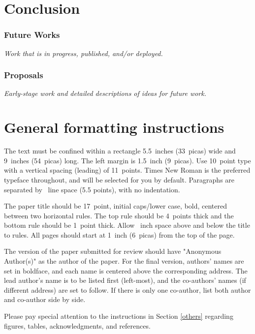 \documentclass{article}
\begin{document}
\section{Conclusion}

\subsubsection{Future Works}



\textit{Work that is in progress, published, and/or deployed.}

\subsubsection{Proposals}

\textit{Early-stage work and detailed descriptions of ideas for future work.}

\section{General formatting instructions}
\label{gen_inst}

The text must be confined within a rectangle 5.5~inches (33~picas) wide and
9~inches (54~picas) long. The left margin is 1.5~inch (9~picas).  Use 10~point
type with a vertical spacing (leading) of 11~points.  Times New Roman is the
preferred typeface throughout, and will be selected for you by default.
Paragraphs are separated by ~line space (5.5 points), with no
indentation.

The paper title should be 17~point, initial caps/lower case, bold, centered
between two horizontal rules. The top rule should be 4~points thick and the
bottom rule should be 1~point thick. Allow ~inch space above and
below the title to rules. All pages should start at 1~inch (6~picas) from the
top of the page.

The version of the paper submitted for review should have "Anonymous Author(s)" as the author of the paper. 
For the final version, authors' names are set in boldface, and each name is
centered above the corresponding address. The lead author's name is to be listed
first (left-most), and the co-authors' names (if different address) are set to
follow. If there is only one co-author, list both author and co-author side by
side.

Please pay special attention to the instructions in Section \ref{others}
regarding figures, tables, acknowledgments, and references.
\end{document}
